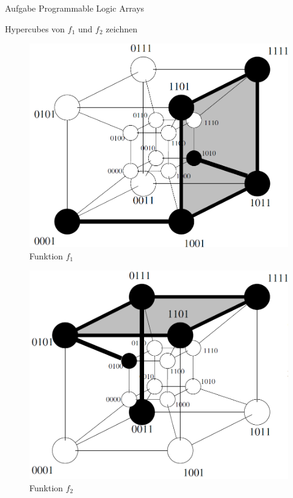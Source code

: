 \begin{frame}[allowframebreaks]{Aufgabe \thesection}{Programmable Logic Arrays}
        \begin{exercisenoinc}
            Hypercubes von $f_1$ und $f_2$ zeichnen
        \end{exercisenoinc}

        \begin{solutionnoinc}
          \begin{figure}
            \includegraphics[scale=0.2, center]{figures/Hypercubef1.png}
            \caption{Funktion $f_1$}
          \end{figure}
        \end{solutionnoinc}

        \begin{solution}
          \begin{figure}
            \includegraphics[scale=0.2, center]{figures/Hypercubef2.png}
            \caption{Funktion $f_2$}
          \end{figure}
        \end{solution}
    \end{frame}
